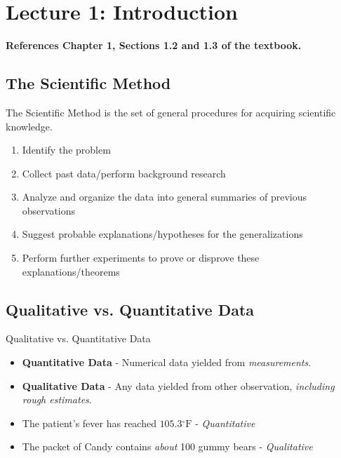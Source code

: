 \section{Lecture 1: Introduction}

\textbf{References Chapter 1, Sections 1.2 and 1.3 of the textbook.}

\vspace{1em}

\begin{minipage}{\textwidth}
\subsection{The Scientific Method}
\begin{defn}
The Scientific Method is the set of general procedures for acquiring scientific knowledge.

\begin{enumerate}
	\item Identify the problem
	\item Collect past data/perform background research
	\item Analyze and organize the data into general summaries of previous observations
	\item Suggest probable explanations/hypotheses for the generalizations
	\item Perform further experiments to prove or disprove these explanations/theorems
\end{enumerate}
\end{defn}
\end{minipage}

\begin{minipage}{\textwidth}
\subsection{Qualitative vs. Quantitative Data}
\begin{defn}
Qualitative vs. Quantitative Data
\begin{itemize}
	\item \textbf{Quantitative Data} - Numerical data yielded from \textit{measurements}.
	\item \textbf{Qualitative Data} - Any data yielded from other observation, \textit{including rough estimates}.
\end{itemize}
\end{defn}

\begin{itemize}
	\item The patient's fever has reached $105.3\mathrm{^\circ F}$ - \textit{Quantitative}
	\item The packet of Candy contains \textit{about} 100 gummy bears - \textit{Qualitative}
\end{itemize}
\end{minipage}

